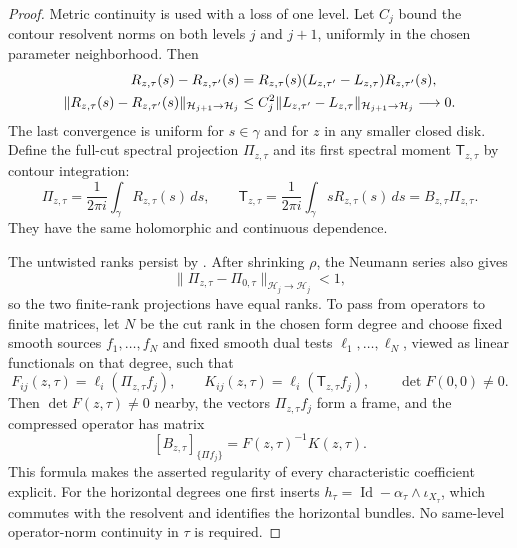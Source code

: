 \documentclass[11pt,letterpaper,reqno]{amsart}
\theoremstyle{remark}
\newcommand{\Id}{\operatorname{Id}}
\begin{document}
\begin{proof}
Metric continuity is used with a loss of one level. Let $C_j$ bound
the contour resolvent norms on both levels $j$ and $j+1$, uniformly
in the chosen parameter neighborhood. Then
\begin{align}\label{xp:resolvent-continuity}
 R_{z,\tau}(s)-R_{z,\tau'}(s)
 &=R_{z,\tau}(s)
       (L_{z,\tau'}-L_{z,\tau})R_{z,\tau'}(s),\\
 \|R_{z,\tau}(s)-R_{z,\tau'}(s)\|_{\mathcal H_{j+1}\to\mathcal H_j}
 &\leq C_j^2
       \|L_{z,\tau'}-L_{z,\tau}\|_{\mathcal H_{j+1}\to\mathcal H_j}
       \longrightarrow0.\notag
\end{align}
The last convergence is uniform for \(s\in\gamma\) and for \(z\)
in any smaller closed disk. Define the full-cut spectral projection
$\Pi_{z,\tau}$ and its first spectral moment $\mathsf T_{z,\tau}$
by contour integration:
\begin{equation}\label{xp:projector-moment}
 \Pi_{z,\tau}=\frac1{2\pi i}\int_\gamma R_{z,\tau}(s)\,ds,
 \qquad
 \mathsf T_{z,\tau}=\frac1{2\pi i}
                   \int_\gamma sR_{z,\tau}(s)\,ds
                 =B_{z,\tau}\Pi_{z,\tau}.
\end{equation}
They have the same holomorphic and continuous dependence.

The untwisted ranks persist by \cite[Appendix B.6]{CD}.  After
shrinking \(\rho\), the Neumann series also gives
\[
 \|\Pi_{z,\tau}-\Pi_{0,\tau}\|_{\mathcal H_j\to\mathcal H_j}<1,
\]
so the two finite-rank projections have equal ranks.  To pass from
operators to finite matrices, let $N$ be the cut rank in the chosen
form degree and choose fixed smooth sources
\(f_1,\ldots,f_N\) and fixed smooth dual tests
\(\ell_1,\ldots,\ell_N\), viewed as linear functionals on that
degree, such that
\begin{equation}\label{xp:frame-matrices}
 F_{ij}(z,\tau)=\ell_i(\Pi_{z,\tau}f_j),
 \qquad
 K_{ij}(z,\tau)=\ell_i(\mathsf T_{z,\tau}f_j),
 \qquad \det F(0,0)\neq0.
\end{equation}
Then \(\det F(z,\tau)\neq0\) nearby, the vectors
\(\Pi_{z,\tau}f_j\) form a frame, and the compressed operator has
matrix
\begin{equation}\label{xp:compressed-matrix}
 [B_{z,\tau}]_{\{\Pi f_j\}}=F(z,\tau)^{-1}K(z,\tau).
\end{equation}
This formula makes the asserted regularity of every characteristic
coefficient explicit.  For the horizontal degrees one first inserts
\(h_\tau=\Id-\alpha_\tau\wedge\iota_{X_\tau}\), which commutes
with the resolvent and identifies the horizontal bundles.  No
same-level operator-norm continuity in \(\tau\) is required.
\end{proof}
\end{document}
